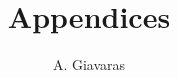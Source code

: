 \documentclass{paper}
\title{Appendices}
\author{A. Giavaras}
\date{}
\theoremstyle{theorem}
\theoremstyle{definition}
\theoremstyle{remark}
\begin{document}
\maketitle
\tableofcontents

\clearpage

\begin{appendices}

\end{appendices}

\clearpage


\end{document}

